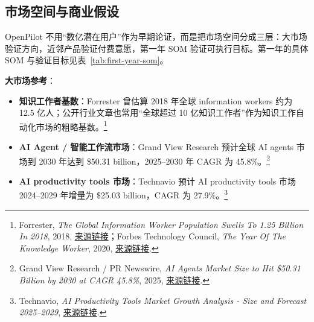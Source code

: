 \documentclass[12pt,a4paper]{ctexart}
\begin{document}
\subsection{市场空间与商业假设}

OpenPilot 不用“数亿潜在用户”作为早期论证，而是把市场空间分成三层：大市场验证方向，近邻产品验证付费意愿，第一年 SOM 验证可执行目标。第一年的具体 SOM 与验证目标见表~\ref{tab:first-year-som}。

\textbf{大市场参考}：
\begin{itemize}
  \item \textbf{知识工作者基数}：Forrester 曾估算 2018 年全球 information workers 约为 12.5 亿人；公开行业文章也常用“全球超过 10 亿知识工作者”作为知识工作自动化市场的粗略基数。\footnote{Forrester, \emph{The Global Information Worker Population Swells To 1.25 Billion In 2018}, 2018, \href{https://www.forrester.com/blogs/the-global-information-worker-population-swells-to-1-25-billion-in-2018/}{来源链接}；Forbes Technology Council, \emph{The Year Of The Knowledge Worker}, 2020, \href{https://www.forbes.com/councils/forbestechcouncil/2020/12/10/the-year-of-the-knowledge-worker/}{来源链接}.}
  \item \textbf{AI Agent / 智能工作流市场}：Grand View Research 预计全球 AI agents 市场到 2030 年达到 \$50.31 billion，2025--2030 年 CAGR 为 45.8\%。\footnote{Grand View Research / PR Newswire, \emph{AI Agents Market Size to Hit \$50.31 Billion by 2030 at CAGR 45.8\%}, 2025, \href{https://www.prnewswire.co.uk/news-releases/ai-agents-market-size-to-hit-50-31-billion-by-2030-at-cagr-45-8---grand-view-research-inc-302447061.html}{来源链接}.}
  \item \textbf{AI productivity tools 市场}：Technavio 预计 AI productivity tools 市场 2024--2029 年增量为 \$25.03 billion，CAGR 为 27.9\%。\footnote{Technavio, \emph{AI Productivity Tools Market Growth Analysis - Size and Forecast 2025--2029}, \href{https://www.technavio.com/report/ai-productivity-tools-market-industry-analysis}{来源链接}.}
\end{itemize}
\end{document}
